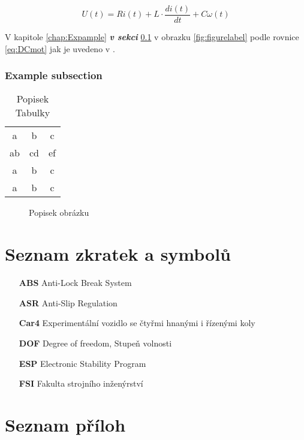 \begin{equation}\label{eq:DCmot2}
U(t) = Ri(t) + L\cdot\frac{di(t)}{dt} + C\omega(t)
\end{equation}


V kapitole \ref{chap:Expample} \textbf{\textit{v sekci}} \ref{sec:Example-subsection} v obrazku \ref{fig:figurelabel} podle rovnice \ref{eq:DCmot} jak je uvedeno v \cite{Atkeson1996}.




\subsection{Example subsection}
\label{sec:Example-subsection}
\lipsum[6]
\lipsum[7]


\begin{table}[tbp] %
	\begin{center}
		\begin{tabular}{ccc}
			a	& b & c \\ 
			ab	& cd & ef \\ 
			a	& b &  c\\ 
			a	& b &  c

		\end{tabular}
	\end{center}
	\caption[Kratky popisek tabulky]{Popisek Tabulky \cite{Atkeson1996}}
	\label{tab:car4Param}
\end{table}


\lipsum

\begin{figure}[tbp] 
	\begin{center}
	\end{center}
	\caption[Kratky popisek]{Popisek obrázku}
	\label{fig:LLM_init}
\end{figure}

\chapter*{Seznam zkratek a symbolů}
\label{chap:loa}
\begin{itemize}
	\item[\textbf{ABS}] Anti-Lock Break System
	
	\item[\textbf{ASR}] Anti-Slip Regulation
	
	\item[\textbf{Car4}] Experimentální vozidlo se čtyřmi hnanými i řízenými koly
	
	\item[\textbf{DOF}] Degree of freedom, Stupeň volnosti
	
	\item[\textbf{ESP}] Electronic Stability Program
	
	\item[\textbf{FSI}] Fakulta strojního inženýrství
\end{itemize}

\chapter*{Seznam příloh}